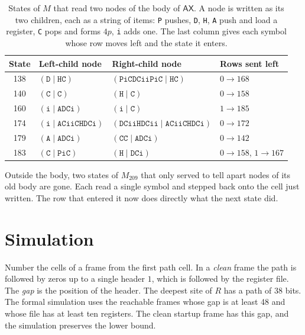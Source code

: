 \documentclass[11pt,letterpaper]{article}
\newcommand{\ax}{\mathsf{AX}}
\begin{document}
\begin{table}[ht]
\centering\small
\begin{tabular}{@{}clll@{}}
\toprule
State & Left-child node & Right-child node & Rows sent left \\
\midrule
138 & $(\mathtt{D}\mid\mathtt{HC})$ & $(\mathtt{PiCDCiiPiC}\mid\mathtt{HC})$ & $0\to168$ \\
140 & $(\mathtt{C}\mid\mathtt{C})$ & $(\mathtt{H}\mid\mathtt{C})$ & $0\to158$ \\
160 & $(\mathtt{i}\mid\mathtt{ADCi})$ & $(\mathtt{i}\mid\mathtt{C})$ & $1\to185$ \\
174 & $(\mathtt{i}\mid\mathtt{ACiiCHDCi})$ & $(\mathtt{DCiiHDCii}\mid\mathtt{ACiiCHDCi})$ & $0\to172$ \\
179 & $(\mathtt{A}\mid\mathtt{ADCi})$ & $(\mathtt{CC}\mid\mathtt{ADCi})$ & $0\to142$ \\
183 & $(\mathtt{C}\mid\mathtt{PiC})$ & $(\mathtt{H}\mid\mathtt{DCi})$ & $0\to158$, $1\to167$ \\
\bottomrule
\end{tabular}
\caption{States of $M$ that read two nodes of the body of $\ax$. A
node is written as its two children, each as a string of items:
\texttt{P} pushes, \texttt{D}, \texttt{H}, \texttt{A} push and load a
register, \texttt{C} pops and forms $4p$, \texttt{i} adds one. The
last column gives each symbol whose row moves left and the state it
enters.}\label{tab:shared}
\end{table}

Outside the body, two states of $M_{209}$ that only served to tell
apart nodes of its old body are gone. Each read a single symbol and
stepped back onto the cell just written. The row that entered it now
does directly what the next state did.

\section{Simulation}\label{sec:simulation}

Number the cells of a frame from the first path cell. In a
\emph{clean} frame the path is followed by zeros up to a single header
$1$, which is followed by the register file. The \emph{gap} is the
position of the header. The deepest site of $R$ has a path of 38
bits. The formal simulation uses the reachable frames whose gap is at
least 48 and whose file has at least ten registers. The clean startup
frame has this gap, and the simulation preserves the lower bound.
\end{document}
